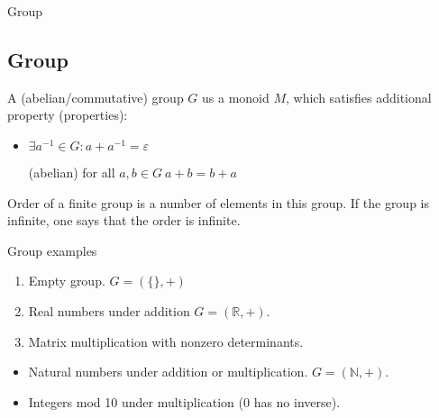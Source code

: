 \documentclass{beamer}
\begin{document}
\begin{frame}{Group}
	\subsection{Group}
	\begin{definition}
		A (abelian/commutative) group $G$ us a monoid $M$, which satisfies additional property (properties):
		\begin{itemize}
			\item $\exists a^{-1} \in G : a + a^{-1} = \varepsilon$
			\item[(abelian)] for all $a, b \in G\ a + b = b + a$
		\end{itemize}
	\end{definition}
	\begin{definition}
		Order of a finite group is a number of elements in this group. If the group is infinite, one says that the order
		is infinite.
	\end{definition}
\end{frame}
	
\begin{frame}{Group examples}
	\begin{example}[Groups]
		\begin{enumerate}
			\item Empty group. $G = (\{\}, +)$
			\item Real numbers under addition $G = (\mathbb{R}, +)$.
			\item Matrix multiplication with nonzero determinants.
		\end{enumerate}
	\end{example}
	\begin{example}
		\begin{itemize}
			\item Natural numbers under addition or multiplication. $G = (\mathbb{N}, +)$.
			\item Integers mod 10 under multiplication (0 has no inverse).
		\end{itemize}
	\end{example}
\end{frame}
\end{document}
